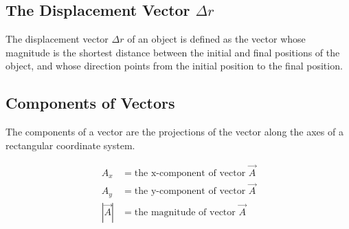\documentclass[12pt]{article}
\begin{document}
\subsection{The Displacement Vector $\Delta r$}
The displacement vector $\Delta r$ of an object is defined as the
vector whose magnitude is the shortest distance between
the initial and final positions of the object, and whose
direction points from the initial position to the final
position.

\subsection{Components of Vectors}
The components of a vector are the projections of the
vector along the axes of a rectangular coordinate system.

\begin{align*}
    A_x &= \text{the x-component of vector } \vec{A} \\
    A_y &= \text{the y-component of vector } \vec{A} \\
    |\vec{A}| &= \text{the magnitude of vector } \vec{A}
\end{align*}
\end{document}
